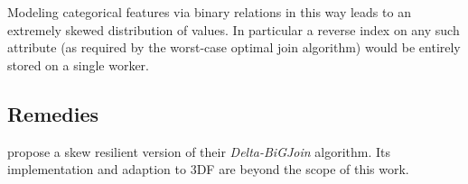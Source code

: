 \documentclass[../catalog.tex]{subfiles}
\begin{document}
Modeling categorical features via binary relations in this way leads
to an extremely skewed distribution of values. In particular a reverse
index on any such attribute (as required by the worst-case optimal
join algorithm) would be entirely stored on a single worker.

\subsection{Remedies}

\cite{ammar2018distributed} propose a skew resilient version of their
\emph{Delta-BiGJoin} algorithm. Its implementation and adaption to 3DF
are beyond the scope of this work.
\end{document}
